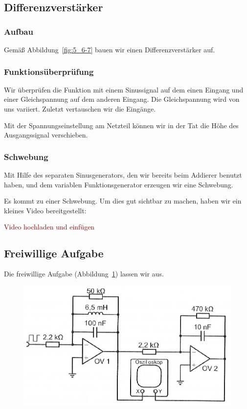 \FloatBarrier
\subsection{Differenzverstärker}

\subsubsection{Aufbau}

Gemäß Abbildung~\ref{fig:5_6-7} bauen wir einen Differenzverstärker auf.

\subsubsection{Funktionsüberprüfung}

Wir überprüfen die Funktion mit einem Sinussignal auf dem einen Eingang und
einer Gleichspannung auf dem anderen Eingang. Die Gleichspannung wird von uns
variiert. Zuletzt vertauschen wir die Eingänge.

Mit der Spannungseinstellung am Netzteil können wir in der Tat die Höhe des
Ausgangssignal verschieben.

\subsubsection{Schwebung}

Mit Hilfe des separaten Sinusgenerators, den wir bereits beim Addierer benutzt
haben, und dem variablen Funktionsgenerator erzeugen wir eine Schwebung.

Es kommt zu einer Schwebung. Um dies gut sichtbar zu machen, haben wir ein
kleines Video bereitgestellt:

\textcolor{darkred}{Video hochladen und einfügen}

\FloatBarrier
\subsection{Freiwillige Aufgabe}

Die freiwillige Aufgabe (Abbildung~\ref{fig:5-2}) lassen wir aus.

\begin{figure}[htbp]
	\centering
	\includegraphics[width=.8\linewidth]{Anleitung/5-2.png}
	\caption{%
		\cite[Abbildung~5.2]{physik313-Anleitung}
	}
	\label{fig:5-2}
\end{figure}

